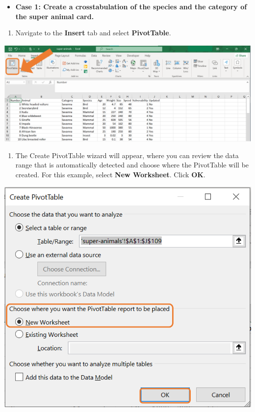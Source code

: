 \documentclass[
]{book}
\providecommand{\tightlist}{%
  \setlength{\itemsep}{0pt}\setlength{\parskip}{0pt}}
\begin{document}
\begin{itemize}
\tightlist
\item
  \textbf{Case 1: Create a crosstabulation of the species and the category of the super animal card.}
\end{itemize}

\begin{enumerate}
\def\labelenumi{\arabic{enumi}.}
\tightlist
\item
  Navigate to the \textbf{Insert} tab and select \textbf{PivotTable}.
\end{enumerate}

\begin{center}\includegraphics[width=0.8\linewidth]{Figures/pivot_1} \end{center}

\newpage

\begin{enumerate}
\def\labelenumi{\arabic{enumi}.}
\setcounter{enumi}{1}
\tightlist
\item
  The Create PivotTable wizard will appear, where you can review the data range that is automatically detected and choose where the PivotTable will be created. For this example, select \textbf{New Worksheet}. Click \textbf{OK}.
\end{enumerate}

\begin{center}\includegraphics[width=0.6\linewidth]{Figures/pivot_2} \end{center}
\end{document}
